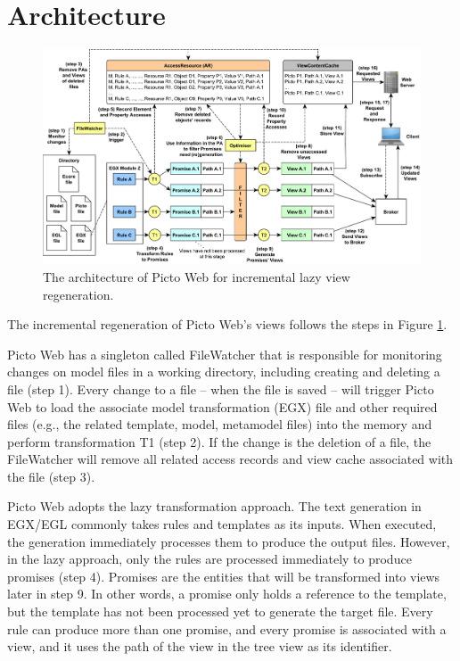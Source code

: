 \section{Architecture}
\label{architecture}

\begin{figure}
	\centering
	\includegraphics[width=\linewidth]{figures/architecture.pdf}
	\caption{The architecture of Picto Web for incremental lazy view regeneration.}
	\label{fig:architecture} 
\end{figure}

The incremental regeneration of Picto Web's views follows the steps in Figure \ref{fig:architecture}. 

Picto Web has a singleton called \textsf{FileWatcher} that is responsible for monitoring changes on model files in a working directory, including creating and deleting a file (step 1). Every change to a file -- when the file is saved -- will trigger Picto Web to load the associate model transformation (EGX) file and other required files (e.g., the related template, model, metamodel files) into the memory and perform transformation \textsf{T1} (step 2). If the change is the deletion of a file, the \textsf{FileWatcher} will remove all related access records and view cache associated with the file (step 3).

Picto Web adopts the lazy transformation approach. The text generation in EGX/EGL commonly takes rules and templates as its inputs. When executed, the generation immediately processes them to produce the output files. However, in the lazy approach, only the rules are processed immediately to produce promises (step 4). Promises are the entities that will be transformed into views later in step 9. In other words, a promise only holds a reference to the template, but the template has not been processed yet to generate the target file. Every rule can produce more than one promise, and every promise is associated with a view, and it uses the path of the view in the tree view as its identifier. 

